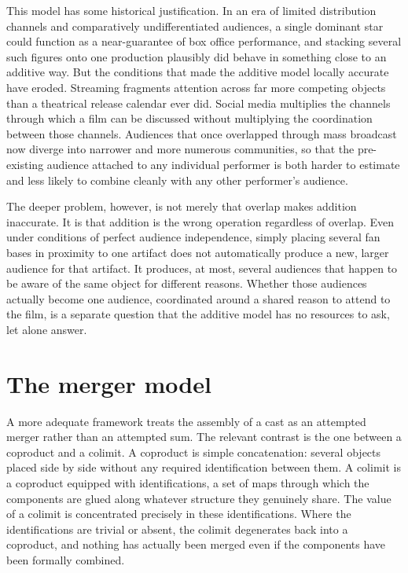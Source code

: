 \documentclass[11pt]{article}
\begin{document}
This model has some historical justification. In an era of limited distribution channels and comparatively undifferentiated audiences, a single dominant star could function as a near-guarantee of box office performance, and stacking several such figures onto one production plausibly did behave in something close to an additive way. But the conditions that made the additive model locally accurate have eroded. Streaming fragments attention across far more competing objects than a theatrical release calendar ever did. Social media multiplies the channels through which a film can be discussed without multiplying the coordination between those channels. Audiences that once overlapped through mass broadcast now diverge into narrower and more numerous communities, so that the pre-existing audience attached to any individual performer is both harder to estimate and less likely to combine cleanly with any other performer's audience.

The deeper problem, however, is not merely that overlap makes addition inaccurate. It is that addition is the wrong operation regardless of overlap. Even under conditions of perfect audience independence, simply placing several fan bases in proximity to one artifact does not automatically produce a new, larger audience for that artifact. It produces, at most, several audiences that happen to be aware of the same object for different reasons. Whether those audiences actually become one audience, coordinated around a shared reason to attend to the film, is a separate question that the additive model has no resources to ask, let alone answer.

\section{The merger model}

A more adequate framework treats the assembly of a cast as an attempted merger rather than an attempted sum. The relevant contrast is the one between a coproduct and a colimit. A coproduct is simple concatenation: several objects placed side by side without any required identification between them. A colimit is a coproduct equipped with identifications, a set of maps through which the components are glued along whatever structure they genuinely share. The value of a colimit is concentrated precisely in these identifications. Where the identifications are trivial or absent, the colimit degenerates back into a coproduct, and nothing has actually been merged even if the components have been formally combined.
\end{document}
